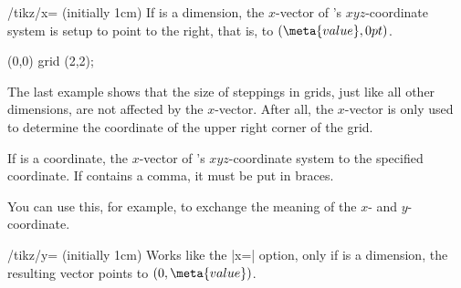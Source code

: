 \begin{key}{/tikz/x= (initially 1cm)}
  If  is a dimension, the $x$-vector of
  \pgfname's $xyz$-coordinate system is setup to point 
   to the right, that is, to $(\meta{value},0pt)$.

\begin{codeexample}[]
\end{codeexample}    

\begin{codeexample}[]
\tikz \draw[x=1.5cm] (0,0) grid (2,2);
\end{codeexample}    

  The last example shows that the size of steppings in grids, just like
  all other dimensions, are not affected by the $x$-vector. After all,
  the $x$-vector is only used to determine the coordinate of the upper
  right corner of the grid.

  If  is a coordinate, the $x$-vector of
  \pgfname's $xyz$-coordinate system to the specified coordinate. If
   contains a comma, it must be put in braces. 

\begin{codeexample}[]
\end{codeexample}

  You can use this, for example, to exchange the meaning of the $x$- and
  $y$-coordinate.

\begin{codeexample}[]
\end{codeexample}
\end{key}

\begin{key}{/tikz/y= (initially 1cm)}
  Works like the |x=| option, only if  is a dimension, the
  resulting vector points to $(0,\meta{value})$.
\end{key}

